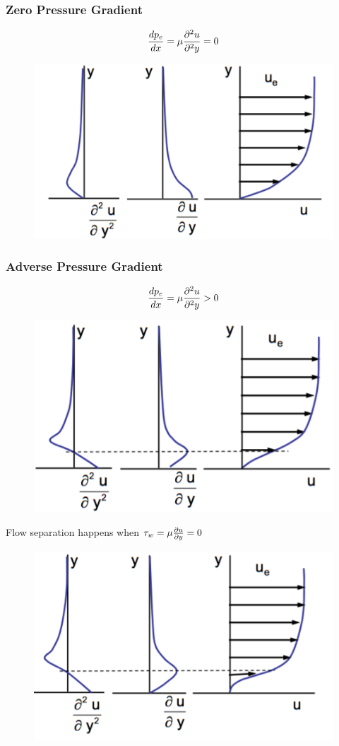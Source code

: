 \documentclass[a4paper]{article}
\begin{document}
    \subsubsection{Zero Pressure Gradient}
    \begin{equation*}
        \frac{dp_e}{dx} = \mu \frac{\partial^2 u}{\partial^2 y} = 0
    \end{equation*}
    \begin{figure}[H]
        \centering
        \includegraphics[width=.5\textwidth]{images/seperation_zero_pg.png}
    \end{figure}
    \subsubsection{Adverse Pressure Gradient}
    \begin{equation*}
        \frac{dp_e}{dx} = \mu \frac{\partial^2 u}{\partial^2 y} > 0
    \end{equation*}
    \begin{figure}[H]
        \centering
        \includegraphics[width=.5\textwidth]{images/seperation_adverse1_pg.png}
    \end{figure}

    Flow separation happens when $\tau_w = \mu \frac{\partial u}{\partial y} = 0$
    \begin{figure}[H]
        \centering
        \includegraphics[width=.5\textwidth]{images/seperation_adverse2_pg.png}
    \end{figure}
\end{document}
